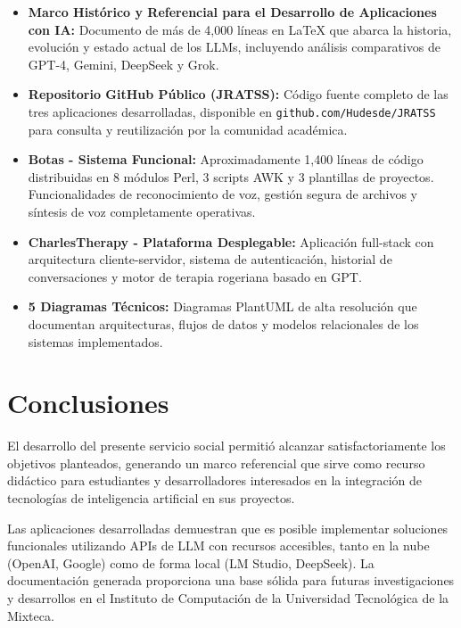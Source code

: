 \documentclass[12pt,letterpaper]{article}
\begin{document}
\begin{itemize}[leftmargin=2cm]
    \item \textbf{Marco Histórico y Referencial para el Desarrollo de Aplicaciones con IA:} Documento de más de 4,000 líneas en \LaTeX{} que abarca la historia, evolución y estado actual de los LLMs, incluyendo análisis comparativos de GPT-4, Gemini, DeepSeek y Grok.
    
    \item \textbf{Repositorio GitHub Público (JRATSS):} Código fuente completo de las tres aplicaciones desarrolladas, disponible en \texttt{github.com/Hudesde/JRATSS} para consulta y reutilización por la comunidad académica.
    
    \item \textbf{Botas - Sistema Funcional:} Aproximadamente 1,400 líneas de código distribuidas en 8 módulos Perl, 3 scripts AWK y 3 plantillas de proyectos. Funcionalidades de reconocimiento de voz, gestión segura de archivos y síntesis de voz completamente operativas.
    
    \item \textbf{CharlesTherapy - Plataforma Desplegable:} Aplicación full-stack con arquitectura cliente-servidor, sistema de autenticación, historial de conversaciones y motor de terapia rogeriana basado en GPT.
    
    \item \textbf{5 Diagramas Técnicos:} Diagramas PlantUML de alta resolución que documentan arquitecturas, flujos de datos y modelos relacionales de los sistemas implementados.
\end{itemize}

\section{Conclusiones}

El desarrollo del presente servicio social permitió alcanzar satisfactoriamente los objetivos planteados, generando un marco referencial que sirve como recurso didáctico para estudiantes y desarrolladores interesados en la integración de tecnologías de inteligencia artificial en sus proyectos.

Las aplicaciones desarrolladas demuestran que es posible implementar soluciones funcionales utilizando APIs de LLM con recursos accesibles, tanto en la nube (OpenAI, Google) como de forma local (LM Studio, DeepSeek). La documentación generada proporciona una base sólida para futuras investigaciones y desarrollos en el Instituto de Computación de la Universidad Tecnológica de la Mixteca.
\end{document}
